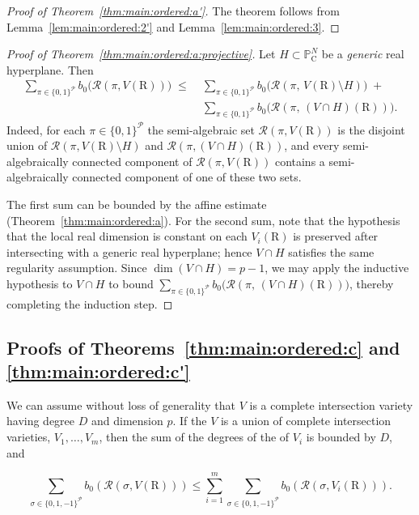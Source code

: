 \documentclass[10pt]{amsart}
\theoremstyle{definition}
\theoremstyle{remark}
\numberwithin{equation}{section}
\newcommand {\R} {\mathrm{R}}
\newcommand {\C}     {\mathrm{C}}
\newcommand {\RR} {{\mathcal R}}
\newcommand {\PP}     {\mathbb{P}} %
\begin{document}
\begin{proof}[Proof of Theorem~\ref{thm:main:ordered:a'}]
The theorem follows from Lemma~\ref{lem:main:ordered:2'} and 
Lemma~\ref{lem:main:ordered:3}.
\end{proof}





\begin{proof}[Proof of Theorem~\ref{thm:main:ordered:a:projective}]
Let $H\subset \PP^N_{\C}$ be a \emph{generic} real hyperplane.  Then
\begin{align*}
\sum_{\pi\in\{0,1\}^{\mathcal P}} b_0\bigl(\RR(\pi,V(\R))\bigr)
\;\le\;&
\sum_{\pi \in\{0,1\}^{\mathcal P}} b_0\bigl(\RR(\pi,\,V(\R)\setminus H)\bigr)
\;+\; \\
&
\sum_{\pi\in\{0,1\}^{\mathcal P}} b_0\bigl(\RR(\pi,\,(V\cap H)(\R))\bigr).
\end{align*}
Indeed, for each $\pi \in \{0,1\}^{\mathcal{P}}$ 
the semi-algebraic set $\RR(\pi,V(\R))$ is the disjoint union of
$\RR(\pi,V(\R)\setminus H)$ and $\RR(\pi,(V\cap H)(\R))$, and every semi-algebraically
connected component of $\RR(\pi,V(\R))$ contains a semi-algebraically connected component
of one of these two sets.

The first sum can be bounded by the affine estimate (Theorem~\ref{thm:main:ordered:a}).
For the second sum, note that the hypothesis that the local real dimension is constant on
each $V_i(\R)$ is preserved after intersecting with a generic real hyperplane; hence
$V\cap H$ satisfies the same regularity assumption.  Since $\dim(V\cap H)=p-1$, we may apply
the inductive hypothesis to $V\cap H$ to bound
$\sum_{\pi\in\{0,1\}^{\mathcal P}} b_0\bigl(\RR(\pi,\,(V\cap H)(\R))\bigr)$,
thereby completing the induction step.
\end{proof}




\subsection{Proofs of Theorems~\ref{thm:main:ordered:c} and \ref{thm:main:ordered:c'}}



We can assume without loss of generality that $V$ is a complete intersection variety having degree $D$ and dimension $p$. If the $V$ is a union of complete intersection varieties, $V_1,\ldots,V_m$, then the sum of the degrees of the 
of $V_i$ is bounded by $D$, and 

\[
\sum_{\sigma \in \{0,1,-1\}^{\mathcal{P}}} b_0(\RR(\sigma,V(\R)))
\leq 
\sum_{i=1}^{m}
\sum_{\sigma \in \{0,1,-1\}^{\mathcal{P}}}b_0(\RR(\sigma,V_i(\R))).
\]
\end{document}

